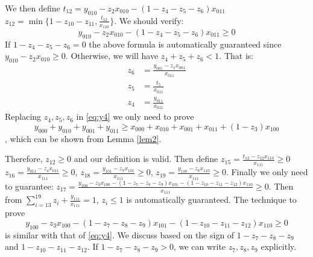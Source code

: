 \documentclass{article}
\begin{document}
    We then define
    $t_{12} = y_{010} - z_2 x_{010} - (1-z_4-z_5-z_6)x_{011}$
    $z_{12} = \min\{1-z_{10} - z_{11}, \frac{t_{12}}{x_{110}}\}$.
    We should verify:
    \begin{equation}\label{eq:y4}
    y_{010} - z_2 x_{010} - (1-z_4-z_5-z_6)x_{011} \geq 0
    \end{equation}
    If $1-z_4 - z_5 - z_6 = 0$ the above formula is automatically guaranteed since $y_{010} - z_2 x_{010} \geq 0$. Otherwise, we will have
    $z_4 + z_5 + z_6 < 1$. That is:
    \begin{align*}
        z_6 &= \frac{y_{001}-z_1x_{001}}{x_{011}}\\
        z_5 &= \frac{t_5}{x_{011}} \\
        z_4 &= \frac{y_{011}}{x_{011}}
    \end{align*}
    Replacing $z_4,z_5,z_6$ in \eqref{eq:y4} we only need to prove
    $$
    y_{000} + y_{010} + y_{001} + y_{011}
    \geq x_{000} + x_{010} + x_{001} + x_{011}
    + (1-z_3) x_{100}
    $$, which can be shown from Lemma \ref{lem2}.
    
    Therefore, $z_{12} \geq 0$ and our definition is valid.
    Then define $z_{15} =\frac{t_{12} - z_{12} x_{110}}{x_{111}} \geq 0$
    $z_{16} = \frac{y_{011} - z_4 x_{011}}{x_{111}} \geq 0$,
    $z_{18} = \frac{y_{101} - z_7 x_{101}}{x_{111}} \geq 0$,
    $z_{19} = \frac{y_{110} - z_8 x_{110}}{x_{111}} \geq 0$.
    Finally we only need to guarantee:
    $z_{17} = \frac{y_{100} - z_3 x_{100} - (1-z_7-z_8-z_9)x_{101} - (1-z_{10}-z_{11} - z_{12})x_{110}}{x_{111}} \geq 0$.
    Then from $\sum_{i=13}^{19} z_i + \frac{y_{111}}{x_{111}} = 1$, $z_i \leq 1$ is automatically guaranteed.
    The technique to prove
    \begin{equation}
        y_{100} - z_3 x_{100} - (1-z_7-z_8-z_9)x_{101} - (1-z_{10}-z_{11} - z_{12})x_{110}\geq 0
    \end{equation}
    is similar with that of \eqref{eq:y4}.
    We discuss based on the sign of $1-z_7-z_8-z_9$ and
    $1-z_{10}-z_{11} - z_{12}$. If $1-z_7-z_8-z_9 > 0$,
    we can write $z_7, z_8, z_9$ explicitly.
\end{document}
